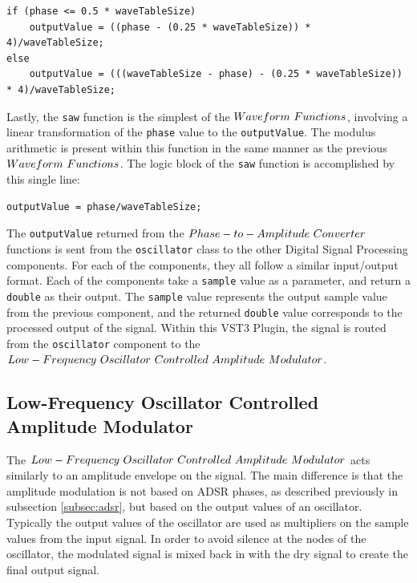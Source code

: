 \documentclass[a4paper,12pt]{report}
\begin{document}
 \noindent\begin{minipage}{\linewidth} \begin{lstlisting}[caption={triangle()},label={code:triangle},captionpos=b]
if (phase <= 0.5 * waveTableSize)
    outputValue = ((phase - (0.25 * waveTableSize)) * 4)/waveTableSize;
else
    outputValue = (((waveTableSize - phase) - (0.25 * waveTableSize)) * 4)/waveTableSize;
\end{lstlisting} \end{minipage}

Lastly, the \texttt{saw} function is the simplest of the $Waveform\ \-Functions$, involving a linear transformation of the \texttt{phase} value to the \texttt{output\-Value}. The modulus arithmetic is present within this function in the same manner as the previous $Waveform\ \-Functions$. The logic block of the \texttt{saw} function is accomplished by this single line:

 \noindent\begin{minipage}{\linewidth} \begin{lstlisting}[caption={saw()},label={code:saw},captionpos=b]
outputValue = phase/waveTableSize;
\end{lstlisting} \end{minipage}

The \texttt{output\-Value} returned from the $Phase-to-Amplitude\ \-Converter$ functions is sent from the \texttt{oscillator} class to the other Digital Signal Processing components. For each of the components, they all follow a similar input/output format. Each of the components take a \texttt{sample} value as a parameter, and return a \texttt{double} as their output. The \texttt{sample} value represents the output sample value from the previous component, and the returned \texttt{double} value corresponds to the processed output of the signal. Within this VST3 Plugin, the signal is routed from the \texttt{oscillator} component to the $Low-Frequency\ \-Oscillator\ \-Controlled\ \-Amplitude\ \-Modulator$.

\subsection{Low-Frequency Oscillator Controlled Amplitude Modulator}
\label{subsec:lfcocontrolampmod}
The $Low-Frequency\ \-Oscillator\ \-Controlled\ \-Amplitude\ \-Modulator$ acts similarly to an amplitude envelope on the signal. The main difference is that the amplitude modulation is not based on ADSR phases, as described previously in subsection \ref{subsec:adsr}, but based on the output values of an oscillator. Typically the output values of the oscillator are used as multipliers on the sample values from the input signal. In order to avoid silence at the nodes of the oscillator, the modulated signal is mixed back in with the dry signal to create the final output signal.
\end{document}

